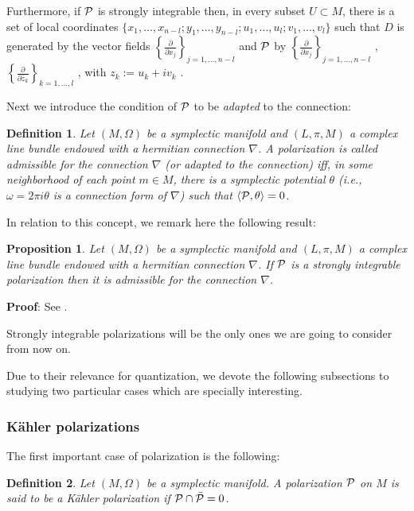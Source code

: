 \documentclass[12pt]{article}
\theoremstyle{plain}
\newtheorem{prop}{Proposition}
\newtheorem{definition}{Definition}
\def\dst{\(}
\def\derpar#1#2{\frac{\partial{#1}}{\partial{#2}}}
\def\qed{\ifvmode\removelastskip\fi
{\unskip\nobreak\hfil\penalty50\hbox{}\nobreak\hfil
\hbox{\vrule height1.2ex width1.2ex}\parfillskip=0pt
\finalhyphendemerits=0 \par\smallskip}}
\def\P{{\cal P}}
\begin{document}
Furthermore, if $\P$ is strongly integrable then,
in every subset $U \subset M$,
there is a set of local coordinates
$\{ x_1, \ldots ,x_{n-l};y_1,\ldots ,y_{n-l};
u_1,\ldots ,u_l;v_1,\ldots ,v_l \}$
such that $D$ is generated by the vector fields
\dst\left\{ \derpar{}{x_j} \right\}_{j=1,\ldots ,n-l}\)
and $\P$ by  \dst\left\{ \derpar{}{x_j} \right\}_{j=1,\ldots ,n-l}\) ,
\dst\left\{ \derpar{}{\bar z_k} \right\}_{k=1,\ldots ,l}\) ,
with $z_k := u_k + i v_k$ \cite{Ki-76}.

Next we introduce the condition of $\P$ to be {\it adapted} to the
connection:

\begin{definition}
Let $(M,\Omega )$ be a symplectic manifold and $(L,\pi ,M)$ a
complex line bundle endowed with a hermitian connection $\nabla$.
A polarization is called {\rm admissible} for the connection
$\nabla$ (or {\rm adapted} to the connection) iff, in some
neighborhood of each point $m \in M$, there is a symplectic
potential $\theta$ (i.e., $\omega = 2\pi i \theta$ is a connection
form of $\nabla$) such that $\langle \P ,\theta \rangle = 0$.
\end{definition}

In relation to this concept, we remark here the following result:

\begin{prop}
Let $(M,\Omega )$ be a symplectic manifold
and $(L,\pi ,M)$ a complex line bundle
endowed with a hermitian connection $\nabla$.
If $\P$ is a strongly integrable polarization
then it is admissible for the connection $\nabla$.
\end{prop}
{\bf Proof}: 
See \cite{Ra-77}.
\qed

Strongly integrable polarizations
will be the only ones
we are going to consider from now on.

Due to their relevance for quantization,
we devote the following subsections to studying
two particular cases which are specially interesting.


\subsubsection{K\"ahler polarizations}
\protect \label{Kpol}


The first important case of polarization is the following:

\begin{definition}
Let $(M,\Omega )$ be a symplectic manifold.
A polarization $\P$ on $M$ is said to be a
{\rm K\"ahler polarization} if $\P \cap \bar \P = 0$.
\end{definition}
\end{document}
